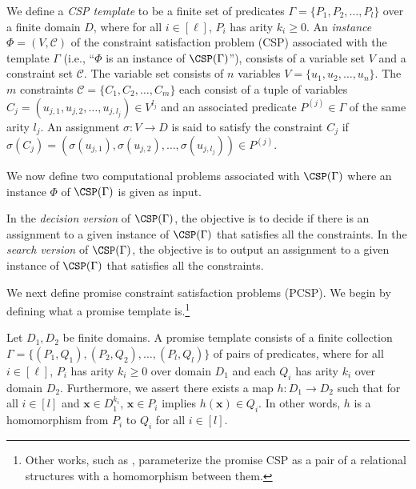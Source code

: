 \begin{definition} {We define a \emph{CSP template} to be a finite set of predicates $\Gamma =\{P_1, P_2, \ldots, P_l\}$ over a finite domain $D$, where for all $i \in [\ell]$, $P_i$ has arity $k_i \ge 0$.}
{An \emph{instance} $\Phi=(V,\mathcal{C})$ of the constraint satisfaction problem (CSP) associated with the template $\Gamma$ (i.e., ``$\Phi$ is an instance of $\CSP(\Gamma)$''), consists of a variable set $V$ and a constraint set $\mathcal C$. The variable set consists of} $n$ variables $V =\{u_1, u_2, \ldots, u_n\}.$ {The} $m$ constraints $\mathcal{C}=\{C_1, C_2, \ldots, C_m\}$ 
each {consist} of a tuple of variables $C_j = (u_{j,1}, u_{j,2}, \ldots, u_{j,{l_j}}) \in V^{l_j}$ and an associated predicate $P^{(j)} \in \Gamma$ of the same arity $l_j$. 
An assignment $\sigma : V \rightarrow D$ is said to satisfy the constraint $C_j$ if $\sigma(C_j)=(\sigma(u_{j,1}), \sigma(u_{j,2}), \ldots, \sigma(u_{j,{l_j}})) \in P^{(j)}$.
\end{definition}

{We now define two computational problems associated with $\CSP(\Gamma)$ where an instance $\Phi$ of $\CSP(\Gamma)$ is given as input.

\begin{definition} In the \emph{decision version} of $\CSP(\Gamma)$, the objective is to decide if there is an assignment to a given instance of $\CSP(\Gamma)$ that satisfies all the constraints. In the \emph{search version} of $\CSP(\Gamma)$, the objective is to output an assignment to a given instance of $\CSP(\Gamma)$ that satisfies all the constraints.
\end{definition}}

We next define {promise constraint satisfaction problems} (PCSP).  {We begin by defining what a promise template is.}\footnote{{Other works, such as \cite{BBKO21}, parameterize the promise CSP as a pair of a relational structures with a homomorphism between them.}}

{
\begin{definition}
    Let $D_1, D_2$ be finite domains. A promise template consists of a finite collection $\Gamma = \{ (P_1,Q_1), (P_2,Q_2),\ldots, (P_l,Q_l)\}$ of pairs of predicates, where for all $i \in [\ell]$, $P_i$ has arity $k_i\ge 0$ over domain $D_1$ and each $Q_i$ has arity $k_i$ over domain $D_2$. Furthermore, we assert there exists a map $h:D_1\rightarrow D_2$ such that for all $i\in[l]$ and $\textbf{x} \in D_1^{k_i}$, $\textbf{x} \in P_i$ implies $h(\textbf{x}) \in Q_i$. In other words, $h$ is a homomorphism from $P_i$ to $Q_i$ for all $i \in [l]$.
\end{definition}
}

